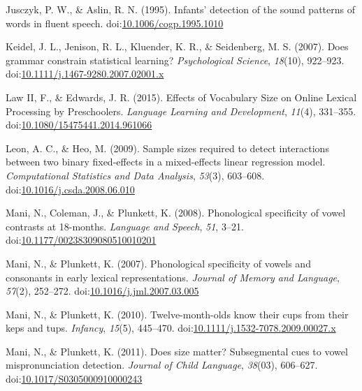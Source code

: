 \documentclass[man]{apa6}
\begin{document}
\leavevmode\hypertarget{ref-Jusczyk1995}{}%
Jusczyk, P. W., \& Aslin, R. N. (1995). Infants' detection of the sound patterns of words in fluent speech. doi:\href{https://doi.org/10.1006/cogp.1995.1010}{10.1006/cogp.1995.1010}

\leavevmode\hypertarget{ref-Keidel2007}{}%
Keidel, J. L., Jenison, R. L., Kluender, K. R., \& Seidenberg, M. S. (2007). Does grammar constrain statistical learning? \emph{Psychological Science}, \emph{18}(10), 922--923. doi:\href{https://doi.org/10.1111/j.1467-9280.2007.02001.x}{10.1111/j.1467-9280.2007.02001.x}

\leavevmode\hypertarget{ref-Law2015}{}%
Law II, F., \& Edwards, J. R. (2015). Effects of Vocabulary Size on Online Lexical Processing by Preschoolers. \emph{Language Learning and Development}, \emph{11}(4), 331--355. doi:\href{https://doi.org/10.1080/15475441.2014.961066}{10.1080/15475441.2014.961066}

\leavevmode\hypertarget{ref-Leon2009}{}%
Leon, A. C., \& Heo, M. (2009). Sample sizes required to detect interactions between two binary fixed-effects in a mixed-effects linear regression model. \emph{Computational Statistics and Data Analysis}, \emph{53}(3), 603--608. doi:\href{https://doi.org/10.1016/j.csda.2008.06.010}{10.1016/j.csda.2008.06.010}

\leavevmode\hypertarget{ref-Mani2008}{}%
Mani, N., Coleman, J., \& Plunkett, K. (2008). Phonological specificity of vowel contrasts at 18-months. \emph{Language and Speech}, \emph{51}, 3--21. doi:\href{https://doi.org/10.1177/00238309080510010201}{10.1177/00238309080510010201}

\leavevmode\hypertarget{ref-Mani2007}{}%
Mani, N., \& Plunkett, K. (2007). Phonological specificity of vowels and consonants in early lexical representations. \emph{Journal of Memory and Language}, \emph{57}(2), 252--272. doi:\href{https://doi.org/10.1016/j.jml.2007.03.005}{10.1016/j.jml.2007.03.005}

\leavevmode\hypertarget{ref-Mani2010kepstups}{}%
Mani, N., \& Plunkett, K. (2010). Twelve-month-olds know their cups from their keps and tups. \emph{Infancy}, \emph{15}(5), 445--470. doi:\href{https://doi.org/10.1111/j.1532-7078.2009.00027.x}{10.1111/j.1532-7078.2009.00027.x}

\leavevmode\hypertarget{ref-Mani2011}{}%
Mani, N., \& Plunkett, K. (2011). Does size matter? Subsegmental cues to vowel mispronunciation detection. \emph{Journal of Child Language}, \emph{38}(03), 606--627. doi:\href{https://doi.org/10.1017/S0305000910000243}{10.1017/S0305000910000243}
\end{document}

